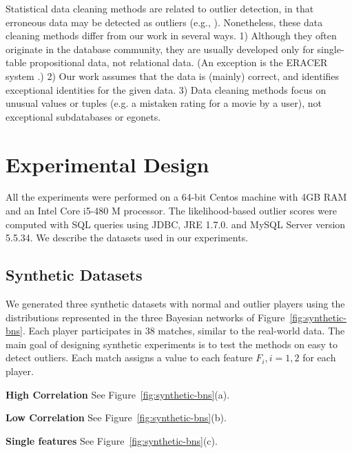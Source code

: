 \documentclass[conference]{IEEEtran}
\begin{document}
Statistical data cleaning methods are related to outlier detection, in that erroneous data may be detected as outliers (e.g., \cite{de2016bayeswipe}). Nonetheless, these data cleaning methods differ from our work in several ways. 1) Although they often originate in the database community, they are usually developed only for single-table propositional data, not relational data. (An exception is the ERACER system \cite{Mayfield2010}.) 2) Our work assumes that the data is (mainly) correct, and identifies exceptional identities for the given data. 3) Data cleaning methods focus on unusual values or tuples (e.g. a mistaken rating for a movie by a user), not exceptional subdatabases or egonets.					
					
				
				\section{Experimental Design}
All the experiments were performed on a 64-bit Centos machine with 4GB RAM and an Intel Core i5-480 M processor. The likelihood-based outlier scores were computed with SQL queries using JDBC, JRE 1.7.0. and MySQL Server version 5.5.34.
We describe the datasets used in our experiments.
				
				\subsection{Synthetic Datasets}
				
				We generated three synthetic datasets with normal and outlier players using the distributions represented in the three Bayesian networks of Figure~\ref{fig:synthetic-bns}. 
				Each player participates in 38 matches, similar to the real-world data. The main goal of designing synthetic experiments is to test the methods on  easy to detect outliers. Each match assigns a value to each feature $F_i, i =  1,2$ for each player. 
				\begin{LaTeXdescription}
				\item\textbf{High Correlation} See Figure~\ref{fig:synthetic-bns}(a).
				\item\textbf{Low Correlation} See Figure~\ref{fig:synthetic-bns}(b).
				\item\textbf{Single features} See Figure~\ref{fig:synthetic-bns}(c).
				\end{LaTeXdescription}
			
\end{document}

